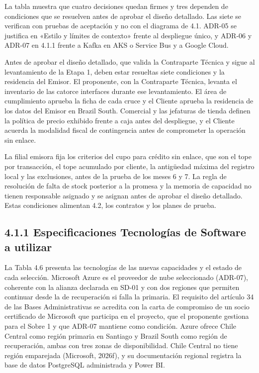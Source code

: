 \documentclass[11pt]{article}
\begin{document}
La tabla muestra que cuatro decisiones quedan firmes y tres dependen de condiciones que se resuelven antes de aprobar el diseño detallado. Las siete se verifican con pruebas de aceptación y no con el diagrama de 4.1. ADR-05 se justifica en «Estilo y límites de contexto» frente al despliegue único, y ADR-06 y ADR-07 en 4.1.1 frente a Kafka en AKS o Service Bus y a Google Cloud.

Antes de aprobar el diseño detallado, que valida la Contraparte Técnica y sigue al levantamiento de la Etapa 1, deben estar resueltas siete condiciones y la residencia del Emisor. El proponente, con la Contraparte Técnica, levanta el inventario de las catorce interfaces durante ese levantamiento. El área de cumplimiento aprueba la ficha de cada cruce y el Cliente aprueba la residencia de los datos del Emisor en Brazil South. Comercial y las jefaturas de tienda definen la política de precio exhibido frente a caja antes del despliegue, y el Cliente acuerda la modalidad fiscal de contingencia antes de comprometer la operación sin enlace.

La filial emisora fija los criterios del cupo para crédito sin enlace, que son el tope por transacción, el tope acumulado por cliente, la antigüedad máxima del registro local y las exclusiones, antes de la prueba de los meses 6 y 7. La regla de resolución de falta de stock posterior a la promesa y la memoria de capacidad no tienen responsable asignado y se asignan antes de aprobar el diseño detallado. Estas condiciones alimentan 4.2, los contratos y los planes de prueba.

\subsection{4.1.1 Especificaciones Tecnologías de Software a utilizar}

La Tabla 4.6 presenta las tecnologías de las nuevas capacidades y el estado de cada selección. Microsoft Azure es el proveedor de nube seleccionado (ADR-07), coherente con la alianza declarada en SD-01 y con dos regiones que permiten continuar desde la de recuperación si falla la primaria. El requisito del artículo 34 de las Bases Administrativas se acredita con la carta de compromiso de un socio certificado de Microsoft que participa en el proyecto, que el proponente gestiona para el Sobre 1 y que ADR-07 mantiene como condición. Azure ofrece Chile Central como región primaria en Santiago y Brazil South como región de recuperación, ambas con tres zonas de disponibilidad. Chile Central no tiene región emparejada (Microsoft, 2026f), y su documentación regional registra la base de datos PostgreSQL administrada y Power BI.
\end{document}
